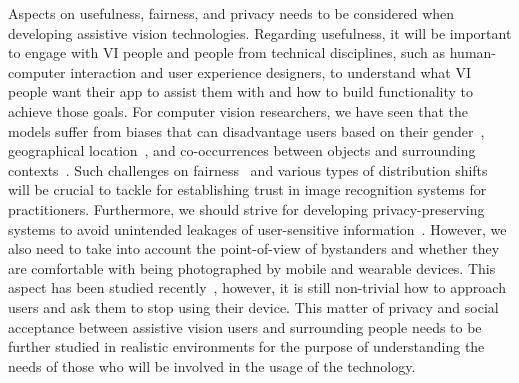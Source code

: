 Aspects on usefulness, fairness, and privacy needs to be considered when developing assistive vision technologies. Regarding usefulness, it will be important to engage with VI people and people from technical disciplines, such as human-computer interaction and user experience designers, to understand what VI people want their app to assist them with and how to build functionality to achieve those goals. For computer vision researchers, we have seen that the models suffer from biases that can disadvantage users based on their gender~\cite{bolukbasi2016man, buolamwini2018gender, burns2018women}, geographical location~\cite{de2019does}, and co-occurrences between objects and surrounding contexts~\cite{singh2020don}. Such challenges on fairness~\cite{barocas2019fairml, holstein2019improving, yang2020towards, goyal2022fairness} and various types of distribution shifts~\cite{quionero2009dataset, wiles2021fine} will be crucial to tackle for establishing trust in image recognition systems for practitioners. Furthermore, we should strive for developing privacy-preserving systems to avoid unintended leakages of user-sensitive information~\cite{ahmed2015privacy, ahmed2017understanding, gurari2019vizwiz, akter2020uncomfortable}. However, we also need to take into account the point-of-view of bystanders and whether they are comfortable with being photographed by mobile and wearable devices. This aspect has been studied recently~\cite{lee2020pedestrian, ahmed2018up, akter2021shared}, however, it is still non-trivial how to approach users and ask them to stop using their device. This matter of privacy and social acceptance between assistive vision users and surrounding people needs to be further studied in realistic environments for the purpose of understanding the needs of those who will be involved in the usage of the technology. 







 




